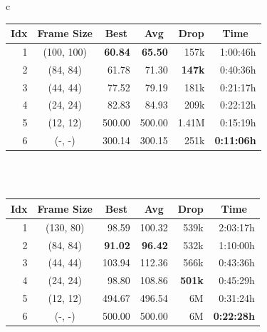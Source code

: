 \begin{table}[htp]
    \begin{center}
        \begin{threeparttable}
            \begin{tabular}{c}
                \begin{tabular}{rcrrrr}
                    \toprule
                    \multicolumn{1}{c}{Idx} & \multicolumn{1}{c}{Frame Size} & \multicolumn{1}{c}{Best} & \multicolumn{1}{c}{Avg} & \multicolumn{1}{c}{Drop} & \multicolumn{1}{c}{Time}\\
                    \midrule
                    1 & (100, 100) & \textbf{60.84} & \textbf{65.50} & 157k & 1:00:46h \\
                    2 & (84, 84) & 61.78 & 71.30 & \textbf{147k} & 0:40:36h \\
                    3 & (44, 44) & 77.52 & 79.19 & 181k & 0:21:17h \\
                    4 & (24, 24) & 82.83 & 84.93 & 209k & 0:22:12h \\
                    5 & (12, 12) & 500.00 & 500.00 & 1.41M & 0:15:19h \\
                    6 & (-, -) & 300.14 & 300.15 & 251k & \textbf{0:11:06h} \\
                    \bottomrule
                \end{tabular} \\
                 \\
                \addlinespace[0.5cm]
                \begin{tabular}{rcrrrr}
                    \toprule
                    \multicolumn{1}{c}{Idx} & \multicolumn{1}{c}{Frame Size} & \multicolumn{1}{c}{Best} & \multicolumn{1}{c}{Avg} & \multicolumn{1}{c}{Drop} & \multicolumn{1}{c}{Time}\\
                    \midrule
                    1 & (130, 80) & 98.59 & 100.32 & 539k & 2:03:17h \\
                    2 & (84, 84) & \textbf{91.02} & \textbf{96.42} & 532k & 1:10:00h \\
                    3 & (44, 44) & 103.94 & 112.36 & 566k & 0:43:36h \\
                    4 & (24, 24) & 98.80 & 108.86 & \textbf{501k} & 0:45:29h \\
                    5 & (12, 12) & 494.67 & 496.54 & 6M & 0:31:24h \\
                    6 & (-, -) & 500.00 & 500.00 & 6M & \textbf{0:22:28h} \\

\end{tabular}
\end{tabular}
\end{threeparttable}
\end{center}
\end{table}
